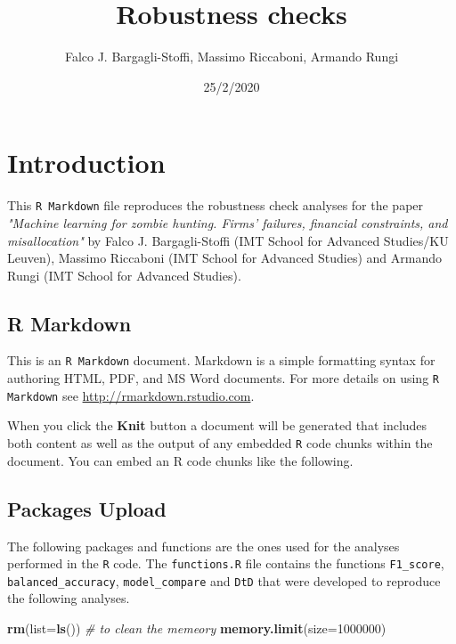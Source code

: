 \documentclass[]{article}
\title{Robustness checks}
\author{Falco J. Bargagli-Stoffi, Massimo Riccaboni, Armando Rungi}
\date{25/2/2020}
\newenvironment{Shaded}{\begin{snugshade}}{\end{snugshade}}
\newcommand{\CommentTok}[1]{\textcolor[rgb]{0.56,0.35,0.01}{\textit{#1}}}
\newcommand{\DataTypeTok}[1]{\textcolor[rgb]{0.13,0.29,0.53}{#1}}
\newcommand{\DecValTok}[1]{\textcolor[rgb]{0.00,0.00,0.81}{#1}}
\newcommand{\KeywordTok}[1]{\textcolor[rgb]{0.13,0.29,0.53}{\textbf{#1}}}
\newcommand{\NormalTok}[1]{#1}
\begin{document}
\maketitle

\hypertarget{introduction}{%
\section{Introduction}\label{introduction}}

This \texttt{R Markdown} file reproduces the robustness check analyses
for the paper
\textit{"Machine learning for zombie hunting. Firms' failures, financial constraints, and misallocation"}
by Falco J. Bargagli-Stoffi (IMT School for Advanced Studies/KU Leuven),
Massimo Riccaboni (IMT School for Advanced Studies) and Armando Rungi
(IMT School for Advanced Studies).

\hypertarget{r-markdown}{%
\subsection{R Markdown}\label{r-markdown}}

This is an \texttt{R Markdown} document. Markdown is a simple formatting
syntax for authoring HTML, PDF, and MS Word documents. For more details
on using \texttt{R Markdown} see \url{http://rmarkdown.rstudio.com}.

When you click the \textbf{Knit} button a document will be generated
that includes both content as well as the output of any embedded
\texttt{R} code chunks within the document. You can embed an R code
chunks like the following.

\hypertarget{packages-upload}{%
\subsection{Packages Upload}\label{packages-upload}}

The following packages and functions are the ones used for the analyses
performed in the \texttt{R} code. The \texttt{functions.R} file contains
the functions \texttt{F1\_score}, \texttt{balanced\_accuracy},
\texttt{model\_compare} and \texttt{DtD} that were developed to
reproduce the following analyses.

\begin{Shaded}
\begin{Highlighting}[]
\KeywordTok{rm}\NormalTok{(}\DataTypeTok{list=}\KeywordTok{ls}\NormalTok{()) }\CommentTok{# to clean the memeory}
\KeywordTok{memory.limit}\NormalTok{(}\DataTypeTok{size=}\DecValTok{1000000}\NormalTok{)}
\end{Highlighting}
\end{Shaded}
\end{document}
